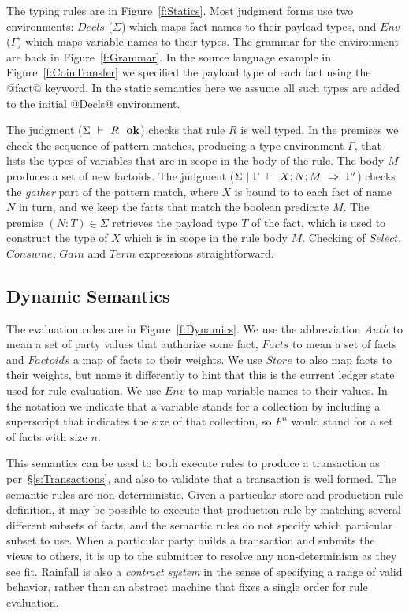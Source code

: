 The typing rules are in Figure~\ref{f:Statics}. Most judgment forms use two environments: $Decls$ ($\Sigma$) which maps fact names to their payload types, and $Env$ ($\Gamma$) which maps variable names to their types. The grammar for the environment are back in Figure~\ref{f:Grammar}. In the source language example in Figure~\ref{f:CoinTransfer} we specified the payload type of each fact using the @fact@ keyword. In the static semantics here we assume all such types are added to the initial @Decls@ environment.

The judgment ($\Sigma ~\vdash~ R~~ \textbf{ok}$) checks that rule $R$ is well typed. In the premises we check the sequence of pattern matches, producing a type environment $\Gamma$, that lists the types of variables that are in scope in the body of the rule. The body $M$ produces a set of new factoids. The judgment ($\Sigma~|~\Gamma~\vdash~X ; N ; M~\Rightarrow~\Gamma'$) checks the \emph{gather} part of the pattern match, where $X$ is bound to to each fact of name $N$ in turn, and we keep the facts that match the boolean predicate $M$. The premise $(N:T) \in \Sigma$ retrieves the payload type $T$ of the fact, which is used to construct the type of $X$ which is in scope in the rule body $M$. Checking of $Select$, $Consume$, $Gain$ and $Term$ expressions straightforward.





\subsection{Dynamic Semantics}
The evaluation rules are in Figure~\ref{f:Dynamics}. We use the abbreviation $Auth$ to mean a set of party values that authorize some fact, $Facts$ to mean a set of facts and $Factoids$ a map of facts to their weights. We use $Store$ to also map facts to their weights, but name it differently to hint that this is the current ledger state used for rule evaluation. We use $Env$ to map variable names to their values. In the notation we indicate that a variable stands for a collection by including a superscript that indicates the size of that collection, so $F^n$ would stand for a set of facts with size $n$.

This semantics can be used to both execute rules to produce a transaction as per~\S\ref{s:Transactions}, and also to validate that a transaction is well formed. The semantic rules are non-deterministic. Given a particular store and production rule definition, it may be possible to execute that production rule by matching several different subsets of facts, and the semantic rules do not specify which particular subset to use. When a particular party builds a transaction and submits the views to others, it is up to the submitter to resolve any  non-determinism as they see fit. Rainfall is also a \emph{contract system} in the sense of specifying a range of valid behavior, rather than an abstract machine that fixes a single order for rule evaluation.

